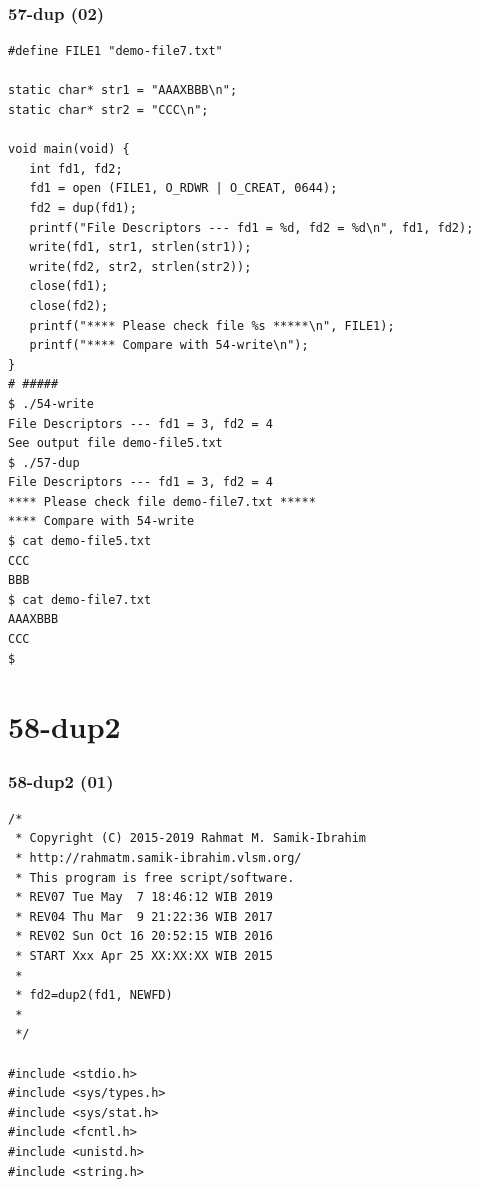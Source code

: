 \documentclass[xcolor=table, notheorems, hyperref={pdfpagelabels=false}]{beamer}
\begin{document}
\begin{frame}[fragile]
\frametitle{57-dup (02)}
\begin{lstlisting}[basicstyle=\ttfamily\tiny]
#define FILE1 "demo-file7.txt"

static char* str1 = "AAAXBBB\n";
static char* str2 = "CCC\n";

void main(void) {
   int fd1, fd2;
   fd1 = open (FILE1, O_RDWR | O_CREAT, 0644);
   fd2 = dup(fd1);
   printf("File Descriptors --- fd1 = %d, fd2 = %d\n", fd1, fd2);
   write(fd1, str1, strlen(str1));
   write(fd2, str2, strlen(str2));
   close(fd1);
   close(fd2);
   printf("**** Please check file %s *****\n", FILE1);
   printf("**** Compare with 54-write\n");
}
# #####
$ ./54-write 
File Descriptors --- fd1 = 3, fd2 = 4
See output file demo-file5.txt
$ ./57-dup 
File Descriptors --- fd1 = 3, fd2 = 4
**** Please check file demo-file7.txt *****
**** Compare with 54-write
$ cat demo-file5.txt 
CCC
BBB
$ cat demo-file7.txt 
AAAXBBB
CCC
$ 

\end{lstlisting}
\end{frame}

\section{58-dup2}
\begin{frame}[fragile]
\frametitle{58-dup2 (01)}
\begin{lstlisting}[basicstyle=\ttfamily\footnotesize]
/*
 * Copyright (C) 2015-2019 Rahmat M. Samik-Ibrahim
 * http://rahmatm.samik-ibrahim.vlsm.org/
 * This program is free script/software. 
 * REV07 Tue May  7 18:46:12 WIB 2019
 * REV04 Thu Mar  9 21:22:36 WIB 2017
 * REV02 Sun Oct 16 20:52:15 WIB 2016
 * START Xxx Apr 25 XX:XX:XX WIB 2015
 *
 * fd2=dup2(fd1, NEWFD)
 *
 */

#include <stdio.h>
#include <sys/types.h>
#include <sys/stat.h>
#include <fcntl.h>
#include <unistd.h>
#include <string.h>

\end{lstlisting}
\end{frame}
\end{document}
